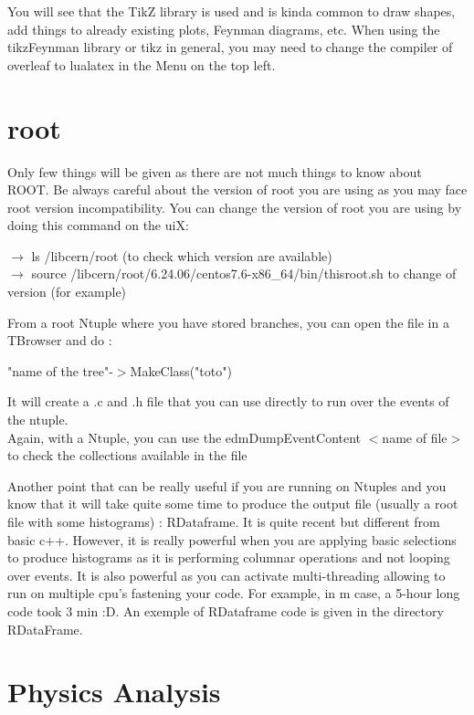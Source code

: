 \documentclass[reprint, a4paper, nofootinbib, amsmath, amssymb, aps]{revtex4-1}
\begin{document}
    You will see that the TikZ library is used and is kinda common to draw shapes, add things to already existing plots, Feynman diagrams, etc. When using the tikzFeynman library or tikz in general, you may need to change the compiler of overleaf to lualatex in the Menu on the top left.
    
\section{root}

 Only few things will be given as there are not much things to know  about ROOT.
 Be always careful about the version of root you are using as you may face root version incompatibility. You can change the version of root you are using by doing this command  on the uiX: \\
 \begin{center}
     $\rightarrow$ ls  /libcern/root (to check which version are available) \\
     $\rightarrow$ source /libcern/root/6.24.06/centos7.6-x86\_64/bin/thisroot.sh to change of version (for example)
 \end{center}

    From a root Ntuple where you have stored branches, you can open the file in a TBrowser and do :
    \begin{center}
        "name of the tree"-$>$MakeClass("toto")
    \end{center}
  It will create a .c and .h file that you can use directly to run over the events of the ntuple.\\
  Again, with a Ntuple, you can use the edmDumpEventContent $<$name of file$>$ to check the collections available in the file
  
  Another point that can be really useful if you are running on Ntuples and you know that it will take quite some time to produce the output file (usually a root file with some histograms) : RDataframe. It is quite recent but different from basic c++. However, it is really powerful when you are applying basic  selections to produce histograms as it is performing columnar operations and not looping over events. It is also powerful as you can activate multi-threading allowing to run on multiple cpu's fastening your code. For example, in m case, a 5-hour long code took 3 min :D. An exemple of RDataframe code is given in the directory RDataFrame. 
\section{Physics Analysis}
\end{document}
